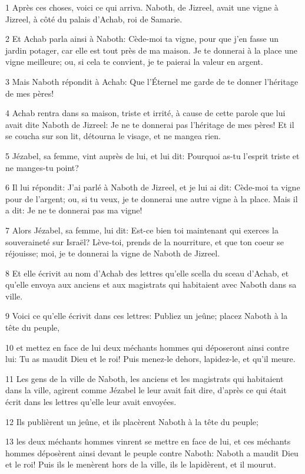\par 1 Après ces choses, voici ce qui arriva. Naboth, de Jizreel, avait une vigne à Jizreel, à côté du palais d'Achab, roi de Samarie.
\par 2 Et Achab parla ainsi à Naboth: Cède-moi ta vigne, pour que j'en fasse un jardin potager, car elle est tout près de ma maison. Je te donnerai à la place une vigne meilleure; ou, si cela te convient, je te paierai la valeur en argent.
\par 3 Mais Naboth répondit à Achab: Que l'Éternel me garde de te donner l'héritage de mes pères!
\par 4 Achab rentra dans sa maison, triste et irrité, à cause de cette parole que lui avait dite Naboth de Jizreel: Je ne te donnerai pas l'héritage de mes pères! Et il se coucha sur son lit, détourna le visage, et ne mangea rien.
\par 5 Jézabel, sa femme, vint auprès de lui, et lui dit: Pourquoi as-tu l'esprit triste et ne manges-tu point?
\par 6 Il lui répondit: J'ai parlé à Naboth de Jizreel, et je lui ai dit: Cède-moi ta vigne pour de l'argent; ou, si tu veux, je te donnerai une autre vigne à la place. Mais il a dit: Je ne te donnerai pas ma vigne!
\par 7 Alors Jézabel, sa femme, lui dit: Est-ce bien toi maintenant qui exerces la souveraineté sur Israël? Lève-toi, prends de la nourriture, et que ton coeur se réjouisse; moi, je te donnerai la vigne de Naboth de Jizreel.
\par 8 Et elle écrivit au nom d'Achab des lettres qu'elle scella du sceau d'Achab, et qu'elle envoya aux anciens et aux magistrats qui habitaient avec Naboth dans sa ville.
\par 9 Voici ce qu'elle écrivit dans ces lettres: Publiez un jeûne; placez Naboth à la tête du peuple,
\par 10 et mettez en face de lui deux méchants hommes qui déposeront ainsi contre lui: Tu as maudit Dieu et le roi! Puis menez-le dehors, lapidez-le, et qu'il meure.
\par 11 Les gens de la ville de Naboth, les anciens et les magistrats qui habitaient dans la ville, agirent comme Jézabel le leur avait fait dire, d'après ce qui était écrit dans les lettres qu'elle leur avait envoyées.
\par 12 Ils publièrent un jeûne, et ils placèrent Naboth à la tête du peuple;
\par 13 les deux méchants hommes vinrent se mettre en face de lui, et ces méchants hommes déposèrent ainsi devant le peuple contre Naboth: Naboth a maudit Dieu et le roi! Puis ils le menèrent hors de la ville, ils le lapidèrent, et il mourut.
